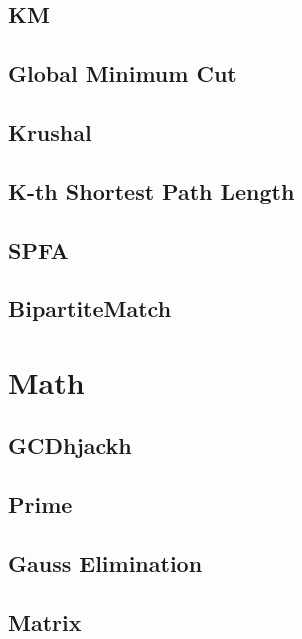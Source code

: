     \subsection{KM}
        
    \subsection{Global Minimum Cut}
        
    \subsection{Krushal}
        
    \subsection{K-th Shortest Path Length}
        
    \subsection{SPFA}
        
    \subsection{BipartiteMatch}
        

\section{Math}
    \subsection{GCDhjackh}
        
    \subsection{Prime}
        
    \subsection{Gauss Elimination}
        
    \subsection{Matrix}
        
        
